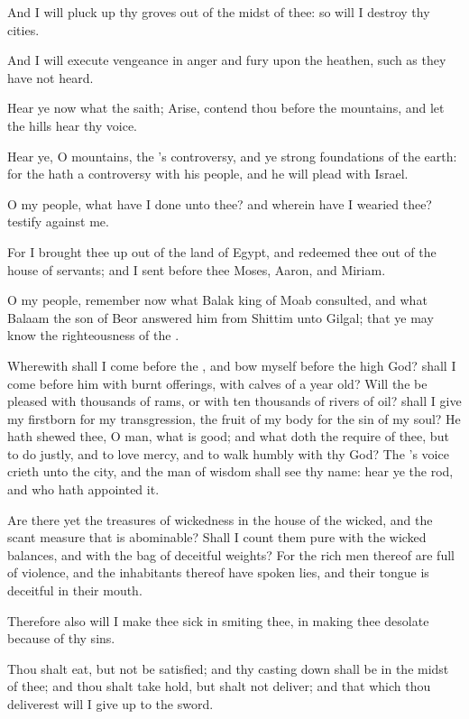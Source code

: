 \Verse And I will pluck up thy groves out of the midst of thee: so will I destroy thy cities.

\Verse And I will execute vengeance in anger and fury upon the heathen, such as they have not heard.


\Chapter
\Verse Hear ye now what the \LORD saith; Arise, contend thou before the mountains, and let the hills hear thy voice.

\Verse Hear ye, O mountains, the \LORD's controversy, and ye strong foundations of the earth: for the \LORD hath a controversy with his people, and he will plead with Israel.

\Verse O my people, what have I done unto thee? and wherein have I wearied thee? testify against me.

\Verse For I brought thee up out of the land of Egypt, and redeemed thee out of the house of servants; and I sent before thee Moses, Aaron, and Miriam.

\Verse O my people, remember now what Balak king of Moab consulted, and what Balaam the son of Beor answered him from Shittim unto Gilgal; that ye may know the righteousness of the \LORD.

\Verse Wherewith shall I come before the \LORD, and bow myself before the high God? shall I come before him with burnt offerings, with calves of a year old?  \Verse Will the \LORD be pleased with thousands of rams, or with ten thousands of rivers of oil? shall I give my firstborn for my transgression, the fruit of my body for the sin of my soul?  \Verse He hath shewed thee, O man, what is good; and what doth the \LORD require of thee, but to do justly, and to love mercy, and to walk humbly with thy God?  \Verse The \LORD's voice crieth unto the city, and the man of wisdom shall see thy name: hear ye the rod, and who hath appointed it.

\Verse Are there yet the treasures of wickedness in the house of the wicked, and the scant measure that is abominable?  \Verse Shall I count them pure with the wicked balances, and with the bag of deceitful weights?  \Verse For the rich men thereof are full of violence, and the inhabitants thereof have spoken lies, and their tongue is deceitful in their mouth.

\Verse Therefore also will I make thee sick in smiting thee, in making thee desolate because of thy sins.

\Verse Thou shalt eat, but not be satisfied; and thy casting down shall be in the midst of thee; and thou shalt take hold, but shalt not deliver; and that which thou deliverest will I give up to the sword.

